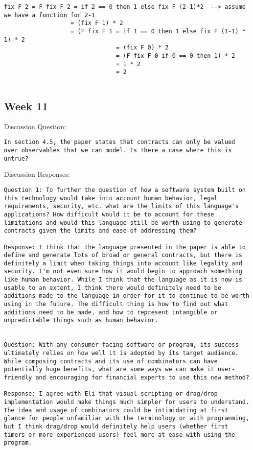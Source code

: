 \documentclass{article}
\theoremstyle{theorem}
\theoremstyle{definition}
\theoremstyle{remark}
\begin{document}
\begin{lstlisting}
fix F 2 = F fix F 2 = if 2 == 0 then 1 else fix F (2-1)*2  --> assume we have a function for 2-1
                   = (fix F 1) * 2
                   = (F fix F 1 = if 1 == 0 then 1 else fix F (1-1) * 1) * 2
                                = (fix F 0) * 2
                                = (F fix F 0 if 0 == 0 then 1) * 2
                                = 1 * 2
                                = 2
               
\end{lstlisting}

\subsection{Week 11}
Discussion Question:
\begin{lstlisting}
In section 4.5, the paper states that contracts can only be valued over observables that we can model. Is there a case where this is untrue? 
\end{lstlisting}

Discussion Responses:
\begin{lstlisting}
Question 1: To further the question of how a software system built on this technology would take into account human behavior, legal requirements, security, etc. what are the limits of this language's applications? How difficult would it be to account for these limitations and would this language still be worth using to generate contracts given the limits and ease of addressing them?

Response: I think that the language presented in the paper is able to define and generate lots of broad or general contracts, but there is definitely a limit when taking things into account like legality and security. I'm not even sure how it would begin to approach something like human behavior. While I think that the language as it is now is usable to an extent, I think there would definitely need to be additions made to the language in order for it to continue to be worth using in the future. The difficult thing is how to find out what additions need to be made, and how to represent intangible or unpredictable things such as human behavior.


Question: With any consumer-facing software or program, its success ultimately relies on how well it is adopted by its target audience. While composing contracts and its use of combinators can have potentially huge benefits, what are some ways we can make it user-friendly and encouraging for financial experts to use this new method?

Response: I agree with Eli that visual scripting or drag/drop implementation would make things much simpler for users to understand. The idea and usage of combinators could be intimidating at first glance for people unfamiliar with the terminology or with programming, but I think drag/drop would definitely help users (whether first timers or more experienced users) feel more at ease with using the program.
\end{lstlisting}
\end{document}
